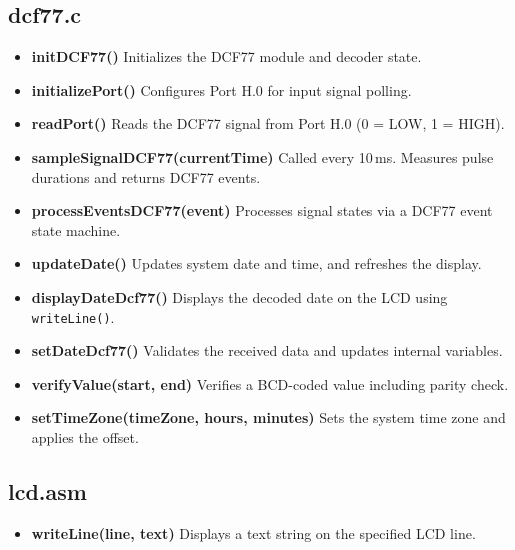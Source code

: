 \documentclass[a4paper,12pt]{article}
\begin{document}

\subsection{dcf77.c}
\begin{itemize}
    \item \textbf{initDCF77()}  
    Initializes the DCF77 module and decoder state.

    \item \textbf{initializePort()}  
    Configures Port H.0 for input signal polling.

    \item \textbf{readPort()}  
    Reads the DCF77 signal from Port H.0 (0 = LOW, 1 = HIGH).

    \item \textbf{sampleSignalDCF77(currentTime)}  
    Called every 10\,ms. Measures pulse durations and returns DCF77 events.

    \item \textbf{processEventsDCF77(event)}  
    Processes signal states via a DCF77 event state machine.

    \item \textbf{updateDate()}  
    Updates system date and time, and refreshes the display.

    \item \textbf{displayDateDcf77()}  
    Displays the decoded date on the LCD using \texttt{writeLine()}.

    \item \textbf{setDateDcf77()}  
    Validates the received data and updates internal variables.

    \item \textbf{verifyValue(start, end)}  
    Verifies a BCD-coded value including parity check.

    \item \textbf{setTimeZone(timeZone, hours, minutes)}  
    Sets the system time zone and applies the offset.
\end{itemize}


\subsection{lcd.asm}
\begin{itemize}
    \item \textbf{writeLine(line, text)}  
    Displays a text string on the specified LCD line.
\end{itemize}
\end{document}
